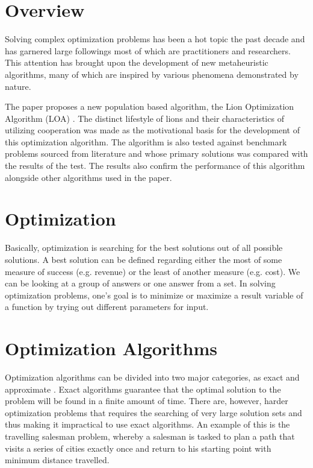 \section{Overview}

\par Solving complex optimization problems has been a hot topic the past decade and has garnered large followings most of which are practitioners and researchers. This attention has brought upon the development of new metaheuristic algorithms, many of which are inspired by various phenomena demonstrated by nature.
\par The paper proposes a new population based algorithm, the Lion Optimization Algorithm (LOA) \cite{loa_2016}. The distinct lifestyle of lions and their characteristics of utilizing cooperation was made as the motivational basis for the development of this optimization algorithm. The algorithm is also tested against benchmark problems sourced from literature and whose primary solutions was compared with the results of the test. The results also confirm the performance of this algorithm alongside other algorithms used in the paper.

\section{Optimization}
\par Basically, optimization is searching for the best solutions out of all possible solutions. A best solution can be defined regarding either the most of some measure of success (e.g. revenue) or the least of another measure (e.g. cost). We can be looking at a group of answers or one answer from a set. In solving optimization problems, one's goal is to minimize or maximize a result variable of a function by trying out different parameters for input. \par

\section{Optimization Algorithms}
\par Optimization algorithms can be divided into two major categories, as exact and approximate \cite{desale_2015}. Exact algorithms guarantee that the optimal solution to the problem will be found in a finite amount of time. There are, however, harder optimization problems that requires the searching of very large solution sets and thus making it impractical to use exact algorithms. An example of this is the travelling salesman problem, whereby a salesman is tasked to plan a path that visits a series of cities exactly once and return to his starting point with minimum distance travelled.

